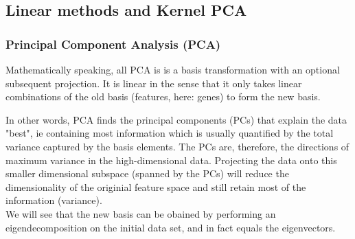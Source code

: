\documentclass[journal, a4paper]{IEEEtran}
\begin{document}
\subsection{Linear methods and Kernel PCA}

\subsubsection{Principal Component Analysis (PCA)}


Mathematically speaking, all PCA is is a basis transformation with an optional subsequent projection. It is linear in the sense that it only takes linear combinations of the old basis (features, here: genes) to form the new basis. 

In other words, PCA finds the principal components (PCs) that explain the data "best", ie containing most information which is usually quantified by the total variance captured by the basis elements. The PCs are, therefore, the directions of maximum variance in the high-dimensional data. Projecting the data onto this smaller dimensional subspace (spanned by the PCs) will reduce the dimensionality of the originial feature space and still retain most of the information (variance). \\
We will see that the new basis can be obained by performing an eigendecomposition on the initial data set, and in fact equals the eigenvectors.


\end{document}
